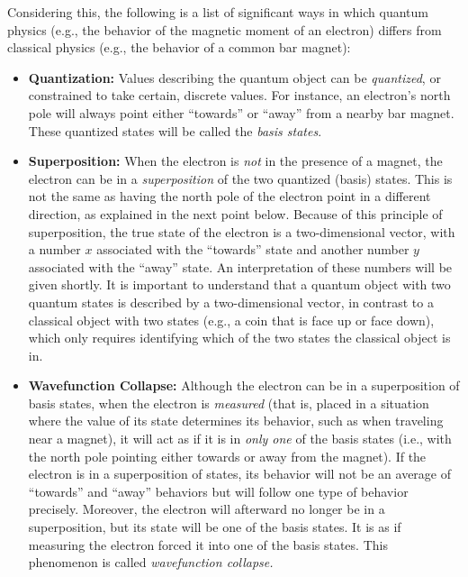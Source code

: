 \documentclass[%
 reprint,
nofootinbib,
 amsmath,amssymb,
 aps,
]{revtex4-2}
\begin{document}
Considering this, the following is a list of significant ways in which quantum physics (e.g., the behavior of the magnetic moment of an electron) differs from classical physics (e.g., the behavior of a common bar magnet):
\begin{itemize}

    \item \textbf{Quantization:} Values describing the quantum object can be \textit{quantized}, or constrained to take certain, discrete values. For instance, an electron's north pole will always point either ``towards'' or ``away'' from a nearby bar magnet. These quantized states will be called the \textit{basis states}.

    \item \textbf{Superposition:} When the electron is \textit{not} in the presence of a magnet, the electron can be in a \textit{superposition} of the two quantized (basis) states. This is not the same as having the north pole of the electron point in a different direction, as explained in the next point below. Because of this principle of superposition, the true state of the electron is a two-dimensional vector, with a number $x$ associated with the ``towards'' state and another number $y$ associated with the ``away'' state. An interpretation of these numbers will be given shortly. It is important to understand that a quantum object with two quantum states is described by a two-dimensional vector, in contrast to a classical object with two states (e.g., a coin that is face up or face down), which only requires identifying which of the two states the classical object is in.

    \item \textbf{Wavefunction Collapse:} Although the electron can be in a superposition of basis states, when the electron is \textit{measured} (that is, placed in a situation where the value of its state determines its behavior, such as when traveling near a magnet), it will act as if it is in \textit{only one} of the basis states (i.e., with the north pole pointing either towards or away from the magnet). If the electron is in a superposition of states, its behavior will not be an average of ``towards'' and ``away'' behaviors but will follow one type of behavior precisely. Moreover, the electron will afterward no longer be in a superposition, but its state will be one of the basis states. It is as if measuring the electron forced it into one of the basis states. This phenomenon is called \textit{wavefunction collapse.}

\end{itemize}
\end{document}
